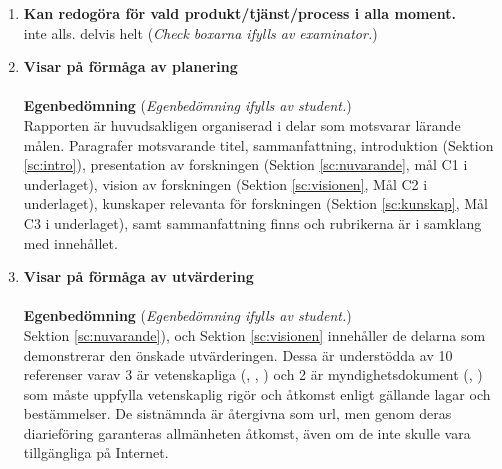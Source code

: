 \documentclass{article}
\begin{document}
\begin{enumerate}
 \item {\bf Kan redogöra för vald produkt/tjänst/process i alla
    moment. }
\\
  \hskip0.4cm \QO{} inte alls. \hskip0.5cm \QO{} delvis \hskip0.5cm
  \QO{} helt  {({\em Check boxarna ifylls av examinator.})}
  \item {\bf Visar på förmåga av planering}\\
      \\
{\bf Egenbedömning} 
({\em \small Egenbedömning ifylls av student.}) \\
Rapporten är huvudsakligen organiserad i delar som motsvarar lärande målen.
  Paragrafer motsvarande
  titel, sammanfattning,
    introduktion (Sektion \ref{sc:intro}), presentation av forskningen
    (Sektion \ref {sc:nuvarande},  mål C1 i underlaget), vision av forskningen
    (Sektion \ref {sc:visionen}, Mål C2 i underlaget), kunskaper relevanta
   för forskningen (Sektion \ref {sc:kunskap}, Mål C3 i underlaget),  samt
    sammanfattning finns och rubrikerna är i samklang med innehållet.
  \item {\bf Visar på förmåga av utvärdering} \\
\\
{\bf Egenbedömning} 
({\em \small Egenbedömning ifylls av student.}) \\
Sektion \ref{sc:nuvarande}), och Sektion \ref{sc:visionen} innehåller de
delarna som demonstrerar den önskade utvärderingen. Dessa är  understödda av 10
referenser varav 3 är vetenskapliga (\cite{Cash08072003},
\cite{locard}, \cite{mikaelyan14darmstadt})  och 2 är
myndighetsdokument (\cite{webutbplan}, \cite{webtransport})  som måste
uppfylla vetenskaplig rigör och åtkomst enligt gällande lagar
och bestämmelser. De sistnämnda är återgivna som url, men genom deras diarieföring
 garanteras allmänheten åtkomst, även   om de inte skulle vara tillgängliga på Internet.
\end{enumerate} 

\end{document}
